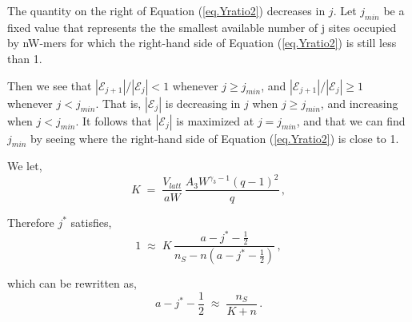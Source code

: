 \documentclass[journal=mamobx,manuscript=article]{achemso}
\begin{document}
The quantity on the right of Equation (\ref{eq.Yratio2}) decreases in $j$.  
Let $j_{min}$ be a fixed value that represents the the smallest available number of j sites occupied by nW-mers for which the right-hand side of Equation (\ref{eq.Yratio2}) is still less than 1.

Then we see that $|\mathcal{E}_{j+1}|/|\mathcal{E}_j|<1$ whenever $j\geq j_{min}$, and 
$|\mathcal{E}_{j+1}|/|\mathcal{E}_j|\geq 1$ whenever $j< j_{min}$.
That is, $|\mathcal{E}_j|$ is decreasing in $j$ when $j\geq j_{min}$, and 
increasing when $j< j_{min}$.
It follows that $|\mathcal{E}_j|$ is maximized at $j=j_{min}$, and that we can find $j_{min}$ by seeing 
where the right-hand side of Equation (\ref{eq.Yratio2}) is close to 1.   

\noindent We let, 
\begin{equation}
    \label{}
K \;=\;   \frac{ V_{latt} }{aW}\, \frac{   A_3W^{\gamma_3-1}(q-1)^2}{q} \,,
\end{equation}


\noindent Therefore $j^*$ satisfies,
\begin{equation}
    \label{}
    1  \;\approx \; 
     K  \,
          \frac{a-j^*-\frac{1}{2}}{n_S-n(a-j^*-\frac{1}{2})}    \,,  
\end{equation}

\noindent which can be rewritten as, 
\begin{equation}
    \label{}
a-j^*-\frac{1}{2} \; \approx\;    \frac{n_S}{K+n}   \,.
\end{equation}

\newpage
\end{document}
